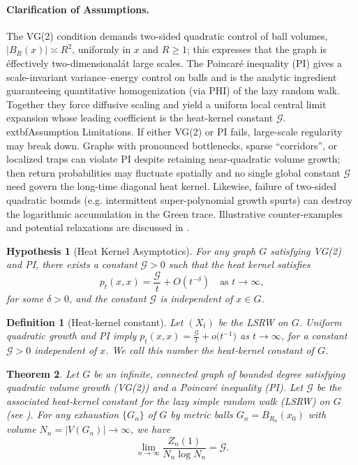 \documentclass[11pt]{article}
\numberwithin{equation}{section}
\newtheorem{theorem}{Theorem}[section]
\newtheorem{definition}[theorem]{Definition}
\newtheorem{hypothesis}{Hypothesis}[section]
\newcommand{\cG}{\mathcal{G}}
\begin{document}
\paragraph{Clarification of Assumptions.} The VG(2) condition demands two-sided quadratic control of ball volumes, $|B_R(x)| \asymp R^2$, uniformly in $x$ and $R\ge1$; this expresses that the graph is \'effectively two-dimensional\' at large scales. The Poincaré inequality (PI) gives a scale-invariant variance--energy control on balls and is the analytic ingredient guaranteeing quantitative homogenization (via PHI) of the lazy random walk. Together they force diffusive scaling and yield a uniform local central limit expansion whose leading coefficient is the heat-kernel constant $\cG$.
	extbf{Assumption Limitations.} If either VG(2) or PI fails, large-scale regularity may break down. Graphs with pronounced bottlenecks, sparse ``corridors'', or localized traps can violate PI despite retaining near-quadratic volume growth; then return probabilities may fluctuate spatially and no single global constant $\cG$ need govern the long-time diagonal heat kernel. Likewise, failure of two-sided quadratic bounds (e.g. intermittent super-polynomial growth spurts) can destroy the logarithmic accumulation in the Green trace. Illustrative counter-examples and potential relaxations are discussed in .
\begin{hypothesis}[Heat Kernel Asymptotics]\label{hyp:HK}
For any graph \( G \) satisfying VG(2) and PI, there exists a constant \( \mathcal{G} > 0 \) such that the heat kernel satisfies
	\[
	p_t(x,x) = \frac{\mathcal{G}}{t} + O(t^{-\delta}) \quad \text{as } t \to \infty,
	\]
for some \( \delta > 0 \), and the constant \( \mathcal{G} \) is independent of \( x \in G \).
\end{hypothesis}

\begin{definition}[Heat-kernel constant]\label{def:G}
Let $(X_t)$ be the LSRW on $G$. Uniform quadratic growth and PI imply
\(
    p_t(x,x)=\frac{\cG}{t}+o\!\bigl(t^{-1}\bigr)
\)
as $t\to\infty$, for a constant $\cG>0$ independent of $x$. We call this number the \emph{heat-kernel constant} of $G$.
\end{definition}

\begin{theorem}\label{thm:main}
Let $G$ be an infinite, connected graph of bounded degree satisfying quadratic volume growth (VG(2)) and a Poincaré inequality (PI). Let $\cG$ be the associated heat-kernel constant for the lazy simple random walk (LSRW) on $G$ (see ). For any exhaustion $\{G_n\}$ of $G$ by metric balls $G_n = B_{R_n}(x_0)$ with volume $N_n = |V(G_n)| \to \infty$, we have
\[
\lim_{n \to \infty} \frac{Z_n(1)}{N_n \log N_n} = \cG.
\]
\end{theorem}
\end{document}
